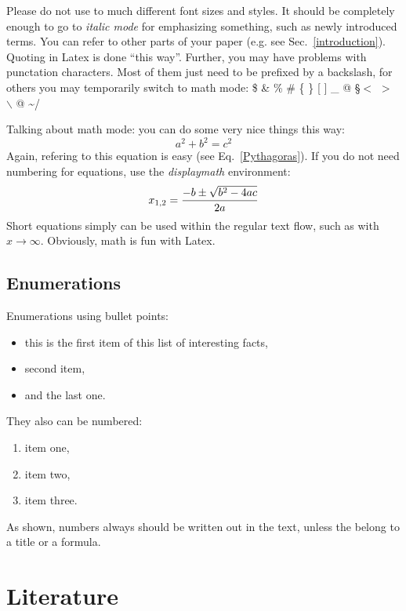 \documentclass[twocolumn]{article}
\begin{document}
Please do not use to much different font sizes and styles. It should
be completely enough to go to {\em italic mode} for emphasizing something,
such as newly introduced terms.
You can refer to other parts of your paper (e.g. see Sec.~\ref{introduction}).
Quoting in Latex is done ``this way''.
Further, you may have problems with punctation characters.
Most of them just need to be prefixed by a backslash, for others you may
temporarily switch to math mode:
\$ \& \% \# \{ \} [ ] \_ @ \S $<$ $>$ $\backslash$ @ \textasciitilde /

Talking about math mode: you can do some very nice things this way:
\begin{equation}
a^2 + b^2 = c^2
\label{Pythagoras}
\end{equation}
Again, refering to this equation is easy (see Eq.~\ref{Pythagoras}).
If you do not need numbering for equations, use the {\em displaymath}
environment:
\begin{displaymath}
x_{1,2} = \frac{-b \pm \sqrt{b^2-4ac}}{2a}\\
\end{displaymath}
Short equations simply can be used within the regular text flow, such
as with $x \to \infty$. Obviously, math is fun with Latex.


\subsection*{Enumerations}

Enumerations using bullet points:

\begin{itemize}
	\item this is the first item of this list of interesting facts,
	\item second item,
	\item and the last one.
\end{itemize}

They also can be numbered:

\begin{enumerate}
	\item item one,
	\item item two,
	\item item three.
\end{enumerate}

As shown, numbers always should be written out in the text, unless the
belong to a title or a formula.

\section{Literature}
\end{document}
